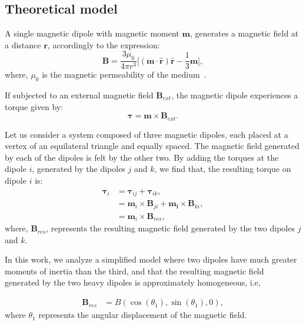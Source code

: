 
\subsection{Theoretical model}

A single magnetic dipole with magnetic moment $\boldsymbol{m}$, generates a magnetic field at a distance $\boldsymbol{r}$, accordingly to the expression: 
\begin{equation}
    \boldsymbol{B} = \dfrac{3\mu_0}{4 \pi r^3}\bigg[ (\boldsymbol{m \cdot \hat{r}})\boldsymbol{\hat{r}} - \dfrac{1}{3}\boldsymbol{m} \bigg],
    \label{eq:MagneticFieldDipole}
\end{equation}
where, $\mu_0$ is the magnetic permeability of the medium~\cite{jackson1999classical}. 

If subjected to an external magnetic field $\boldsymbol{B}_{ext}$, the magnetic dipole experiences a torque given by: 
\begin{equation}
    \boldsymbol{\tau} = \boldsymbol{m} \times \boldsymbol{B}_{ext}.
    \label{eq:NewtonSecondLaw}
\end{equation}

Let us consider a system composed of three magnetic dipoles, each placed at a vertex of an equilateral triangle and equally spaced. The magnetic field generated by each of the dipoles is felt by the other two. By adding the torques at the dipole $i$, generated by the dipoles $j$ and $k$, we find that, the resulting torque on dipole $i$ is:
\begin{equation}
    \begin{aligned}
        \boldsymbol{\tau}_i &= \boldsymbol{\tau}_{ij} + \boldsymbol{\tau}_{ik},\\
            & =  \boldsymbol{m}_i \times \boldsymbol{B}_{j i}+\boldsymbol{m_i} \times \boldsymbol{B}_{k i},\\
            &= \boldsymbol{m}_i \times \boldsymbol{B}_{res},
    \end{aligned}
    \label{eq:Torques}
\end{equation}
where, $\boldsymbol{B}_{res}$, represents the resulting magnetic field generated by the two dipoles $j$ and $k$. 

In this work, we analyze a simplified model where two dipoles have much greater moments of inertia than the third, and that the resulting magnetic field generated by the two heavy dipoles is approximately homogeneous, i.e,

\begin{equation}
    \begin{aligned}
        \boldsymbol{B}_{res} &= B(\cos(\theta_1),\sin(\theta_1), 0),
    \end{aligned}
    \label{eq:Hipotesys}
\end{equation}
where $\theta_1$ represents the angular displacement of the magnetic field.

